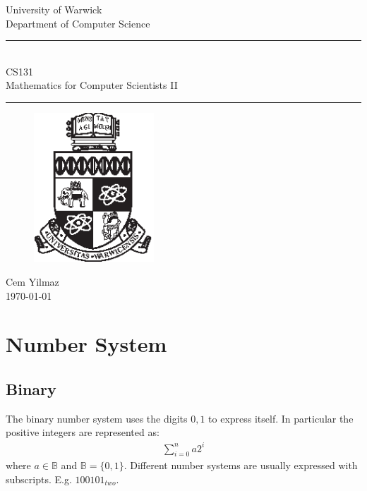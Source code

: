 \documentclass[a4paper]{article}
\theoremstyle{plain}
\theoremstyle{definition}
\newtheorem{defn}{Definition}[section]
\theoremstyle{remark}
\begin{document}
	\begin{titlepage}
	\begin{center}
	\large
	University of Warwick \\
	Department of Computer Science \\
	\huge
	\vspace{50mm}
	\rule{\linewidth}{0.5pt} \\
	CS131 \\
	\vspace{5mm}
	\Large
	Mathematics for Computer Scientists II
	\rule{\linewidth}{0.5pt}
	\vspace{5mm}
	\begin{figure}[H]
	\centering
	\includegraphics[width=0.4\textwidth]{crest_black.eps}
	\end{figure}
	\vspace{37mm}
	Cem Yilmaz \\
	\today
	\end{center}
	\end{titlepage}
	\newpage
	\tableofcontents
	\newpage
\section{Number System}
\subsection{Binary}
\begin{tcolorbox}[colback=black!3!white,colframe=black!60!white,title=\begin{defn}Binary number system \label{Binary number system}\end{defn}]
The binary number system uses the digits $0,1$ to express itself. In particular the positive integers are represented as:
\begin{align}
\sum_{i=0}^{n} a2^{i}
\end{align}
where $a \in \mathbb{B}$ and $\mathbb{B} = \{0,1\}$. Different number systems are usually expressed with subscripts. E.g. $100101_{two}$. 
\end{tcolorbox}
\end{document}
